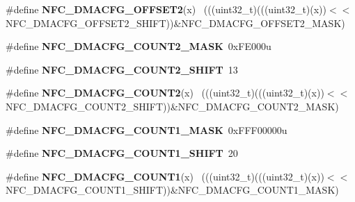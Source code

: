 \begin{DoxyCompactItemize}
\item 
\hypertarget{group___n_f_c___register___masks_gacce5d6e24262f4a82026113a4b2911cc}{}\#define {\bfseries N\+F\+C\+\_\+\+D\+M\+A\+C\+F\+G\+\_\+\+O\+F\+F\+S\+E\+T2}(x)                                    ~(((uint32\+\_\+t)(((uint32\+\_\+t)(x))$<$$<$N\+F\+C\+\_\+\+D\+M\+A\+C\+F\+G\+\_\+\+O\+F\+F\+S\+E\+T2\+\_\+\+S\+H\+I\+F\+T))\&N\+F\+C\+\_\+\+D\+M\+A\+C\+F\+G\+\_\+\+O\+F\+F\+S\+E\+T2\+\_\+\+M\+A\+S\+K)\label{group___n_f_c___register___masks_gacce5d6e24262f4a82026113a4b2911cc}

\item 
\hypertarget{group___n_f_c___register___masks_ga3ee631aba6866716295f3a36f8dd586b}{}\#define {\bfseries N\+F\+C\+\_\+\+D\+M\+A\+C\+F\+G\+\_\+\+C\+O\+U\+N\+T2\+\_\+\+M\+A\+S\+K}~0x\+F\+E000u\label{group___n_f_c___register___masks_ga3ee631aba6866716295f3a36f8dd586b}

\item 
\hypertarget{group___n_f_c___register___masks_ga02ff4ad3cd1db98ba1c6ea520f1754cb}{}\#define {\bfseries N\+F\+C\+\_\+\+D\+M\+A\+C\+F\+G\+\_\+\+C\+O\+U\+N\+T2\+\_\+\+S\+H\+I\+F\+T}~13\label{group___n_f_c___register___masks_ga02ff4ad3cd1db98ba1c6ea520f1754cb}

\item 
\hypertarget{group___n_f_c___register___masks_gae98805482ee2b4829c386335ea3ca349}{}\#define {\bfseries N\+F\+C\+\_\+\+D\+M\+A\+C\+F\+G\+\_\+\+C\+O\+U\+N\+T2}(x)                                      ~(((uint32\+\_\+t)(((uint32\+\_\+t)(x))$<$$<$N\+F\+C\+\_\+\+D\+M\+A\+C\+F\+G\+\_\+\+C\+O\+U\+N\+T2\+\_\+\+S\+H\+I\+F\+T))\&N\+F\+C\+\_\+\+D\+M\+A\+C\+F\+G\+\_\+\+C\+O\+U\+N\+T2\+\_\+\+M\+A\+S\+K)\label{group___n_f_c___register___masks_gae98805482ee2b4829c386335ea3ca349}

\item 
\hypertarget{group___n_f_c___register___masks_ga1834832487fc8c3f92db0af038821853}{}\#define {\bfseries N\+F\+C\+\_\+\+D\+M\+A\+C\+F\+G\+\_\+\+C\+O\+U\+N\+T1\+\_\+\+M\+A\+S\+K}~0x\+F\+F\+F00000u\label{group___n_f_c___register___masks_ga1834832487fc8c3f92db0af038821853}

\item 
\hypertarget{group___n_f_c___register___masks_ga890b0a8d901c202b5243ff2a5eecd3db}{}\#define {\bfseries N\+F\+C\+\_\+\+D\+M\+A\+C\+F\+G\+\_\+\+C\+O\+U\+N\+T1\+\_\+\+S\+H\+I\+F\+T}~20\label{group___n_f_c___register___masks_ga890b0a8d901c202b5243ff2a5eecd3db}

\item 
\hypertarget{group___n_f_c___register___masks_ga83290311c7aa6506c4a1cf15d75a3b19}{}\#define {\bfseries N\+F\+C\+\_\+\+D\+M\+A\+C\+F\+G\+\_\+\+C\+O\+U\+N\+T1}(x)                                      ~(((uint32\+\_\+t)(((uint32\+\_\+t)(x))$<$$<$N\+F\+C\+\_\+\+D\+M\+A\+C\+F\+G\+\_\+\+C\+O\+U\+N\+T1\+\_\+\+S\+H\+I\+F\+T))\&N\+F\+C\+\_\+\+D\+M\+A\+C\+F\+G\+\_\+\+C\+O\+U\+N\+T1\+\_\+\+M\+A\+S\+K)\label{group___n_f_c___register___masks_ga83290311c7aa6506c4a1cf15d75a3b19}


\end{DoxyCompactItemize}
